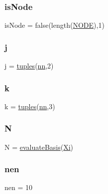 \subsubsection{\texorpdfstring{is\+Node}{isNode}}
{\footnotesize\ttfamily is\+Node = false(length(\hyperlink{a00605_a28010846a3742b3c2c07f00b1f1536ff}{N\+O\+DE}),1)}

\mbox{\label{a00605_abf2bc2545a4a5f5683d9ef3ed0d977e0}} 
\subsubsection{\texorpdfstring{j}{j}}
{\footnotesize\ttfamily j = \hyperlink{a00605_ae906280b3cb956d2555d33b882cca5bf}{tuples}(\hyperlink{a00605_a29f8cac5eb66bce13c51cf794c698f74}{nn},2)}

\mbox{\label{a00605_adc468c70fb574ebd07287b38d0d0676d}} 
\subsubsection{\texorpdfstring{k}{k}}
{\footnotesize\ttfamily k = \hyperlink{a00605_ae906280b3cb956d2555d33b882cca5bf}{tuples}(\hyperlink{a00605_a29f8cac5eb66bce13c51cf794c698f74}{nn},3)}

\mbox{\label{a00605_a8cc2e7240164328fdc3f0e5e21032c56}} 
\subsubsection{\texorpdfstring{N}{N}}
{\footnotesize\ttfamily N = \hyperlink{a00599_a2aba2292a481f3bb8f85213baf22686b}{evaluate\+Basis}(\hyperlink{a00605_a34d6ec2e729af94d4261c2243a358e05}{Xi})}

\mbox{\label{a00605_acbbc42389c3587d1280ad7f1322035ba}} 
\subsubsection{\texorpdfstring{nen}{nen}}
{\footnotesize\ttfamily nen = 10}

